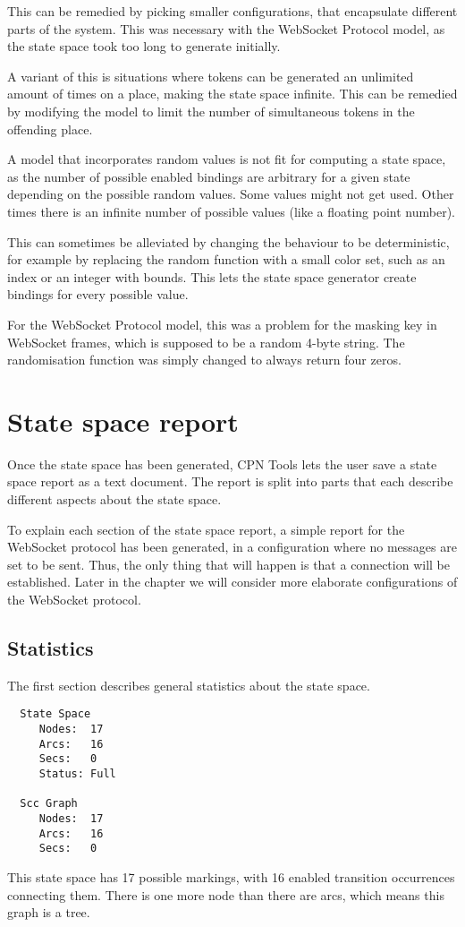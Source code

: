 		This can be remedied by picking smaller configurations,  that encapsulate
		different parts of the system. This was necessary with the WebSocket Protocol
		model, as the state space took too long to generate initially.
		
		A variant of this is situations where tokens can be generated an
		unlimited amount of times on a place, making the state space infinite. This
		can be remedied by modifying the model to limit the number of simultaneous
		tokens in the offending place.
		
		A model that incorporates random values is not fit for computing a state
		space, as the number of possible enabled bindings are arbitrary for a given
		state depending on the possible random values. Some values might not get used. Other
		times there is an infinite number of possible values (like a floating point
		number).
		
		This can sometimes be alleviated by changing the behaviour to be
		deterministic, for example by replacing the random function with a small color
		set, such as an index or an integer with bounds. This lets the state space
		generator create bindings for every possible value. 
		
		For the WebSocket Protocol model, this was a problem for the masking key in
		WebSocket frames, which is supposed to be a random 4-byte string. The
		randomisation function was simply changed to always return four zeros.

\section{State space report}
Once the state space has been generated, CPN Tools lets the user save a
state space report as a text document. The report is split into parts that each
describe different aspects about the state space.

To explain each section of the state space report, a simple report for the
WebSocket protocol has been generated, in a configuration where no messages are
set to be sent. Thus, the only thing that will happen is that a connection will
be established. Later in the chapter we will consider more elaborate
configurations of the WebSocket protocol.
	
	\subsection{Statistics}
	The first section describes general statistics about the state space.
	\begin{lstlisting}
  State Space
     Nodes:  17
     Arcs:   16
     Secs:   0
     Status: Full

  Scc Graph
     Nodes:  17
     Arcs:   16
     Secs:   0

	\end{lstlisting}
	This state space has 17 possible markings, with 16 enabled transition
	occurrences connecting them. There is one more node than there are arcs, which
	means this graph is a tree.
	
